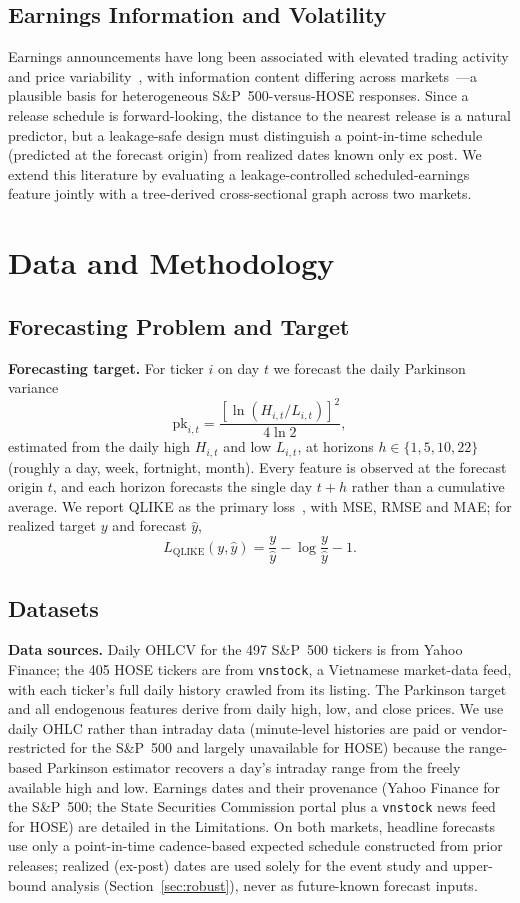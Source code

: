 \documentclass[runningheads]{llncs}
\begin{document}
\subsection{Earnings Information and Volatility}
Earnings announcements have long been associated with elevated trading activity and price
variability~\cite{beaver1968,patell1981}, with information content differing across
markets~\cite{defond2007}---a plausible basis for heterogeneous S\&P~500-versus-HOSE responses. Since a
release schedule is forward-looking, the distance to the nearest release is a natural predictor, but a
leakage-safe design must distinguish a point-in-time schedule (predicted at the forecast origin) from
realized dates known only ex post. We extend this literature by evaluating a leakage-controlled
scheduled-earnings feature jointly with a tree-derived cross-sectional graph across two markets.

\FloatBarrier

\section{Data and Methodology}

\subsection{Forecasting Problem and Target}
\indent\textbf{Forecasting target.} For ticker $i$ on day $t$ we forecast the daily Parkinson variance
\[ \mathrm{pk}_{i,t}=\frac{[\ln(H_{i,t}/L_{i,t})]^2}{4\ln 2}, \]
estimated from the daily high $H_{i,t}$ and low $L_{i,t}$, at horizons $h\in\{1,5,10,22\}$ (roughly a day,
week, fortnight, month). Every feature is observed at the forecast origin $t$, and each horizon forecasts
the single day $t+h$ rather than a cumulative average. We report QLIKE as the primary
loss~\cite{patton2011}, with MSE, RMSE and MAE; for realized target $y$ and forecast $\hat y$,
\[ L_{\mathrm{QLIKE}}(y,\hat y)=\frac{y}{\hat y}-\log\frac{y}{\hat y}-1. \]

\subsection{Datasets}
\textbf{Data sources.} Daily OHLCV for the 497 S\&P~500 tickers is from Yahoo Finance; the 405 HOSE
tickers are from \texttt{vnstock}, a Vietnamese market-data feed, with each ticker's full daily history
crawled from its listing. The Parkinson target and all endogenous features derive from daily high, low,
and close prices. We use daily OHLC rather than intraday data (minute-level histories are paid or
vendor-restricted for the S\&P~500 and largely unavailable for HOSE) because the range-based Parkinson
estimator recovers a day's intraday range from the freely available high and low. Earnings dates and their
provenance (Yahoo Finance for the S\&P~500; the State
Securities Commission portal plus a \texttt{vnstock} news feed for HOSE) are detailed in the Limitations.
On both markets, headline forecasts use only a point-in-time cadence-based expected schedule constructed
from prior releases; realized (ex-post) dates are used solely for the event study and upper-bound analysis
(Section~\ref{sec:robust}), never as future-known forecast inputs.
\end{document}
